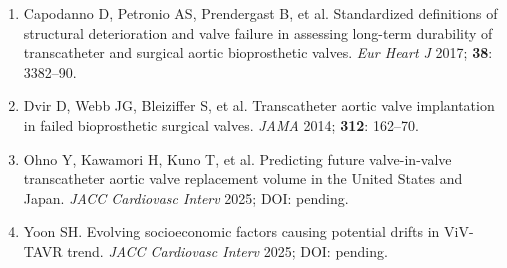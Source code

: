 \documentclass[10pt, a4paper]{article}
\begin{document}
\begin{enumerate}[leftmargin=*, label={\arabic*.}, itemsep=1pt]
    \item Capodanno D, Petronio AS, Prendergast B, et al. Standardized definitions of structural deterioration and valve failure in assessing long-term durability of transcatheter and surgical aortic bioprosthetic valves. \textit{Eur Heart J} 2017; \textbf{38}: 3382--90.
    \item Dvir D, Webb JG, Bleiziffer S, et al. Transcatheter aortic valve implantation in failed bioprosthetic surgical valves. \textit{JAMA} 2014; \textbf{312}: 162--70.
    \item Ohno Y, Kawamori H, Kuno T, et al. Predicting future valve-in-valve transcatheter aortic valve replacement volume in the United States and Japan. \textit{JACC Cardiovasc Interv} 2025; DOI: pending.
    \item Yoon SH. Evolving socioeconomic factors causing potential drifts in ViV-TAVR trend. \textit{JACC Cardiovasc Interv} 2025; DOI: pending.
\end{enumerate}
\end{document}
